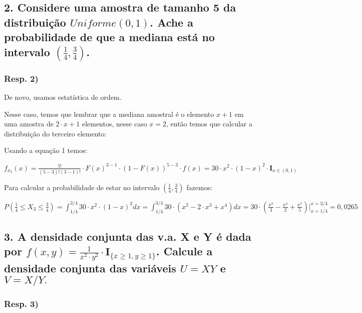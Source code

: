 \documentclass[english]{article}
\begin{document}
\subsection*{\textcompwordmark{}}


\subsection*{\textmd{2. Considere uma amostra de tamanho 5 da distribuição $Uniforme(0,1)$.
Ache a probabilidade de que a mediana está no intervalo $(\frac{1}{4},\frac{3}{4})$. }}


\subsubsection*{\textmd{Resp}. \textmd{2)}}

De novo, usamos estatística de ordem.

Nesse caso, temos que lembrar que a mediana amostral é o elemento
$x+1$ em uma amostra de $2\cdot x+1$ elementos, nesse caso $x=2$,
então temos que calcular a distribuição do terceiro elemento:

Usando a equação 1 temos:

$f_{x_{3}}(x)=\frac{5!}{(5-3)!(3-1)!}\cdot F(x)^{3-1}\cdot(1-F(x))^{5-3}\cdot f(x)=30\cdot x^{2}\cdot(1-x)^{2}\cdot\mathbf{I}_{x\in(0,1)}$

Para calcular a probabilidade de estar no intervalo $(\frac{1}{4},\frac{3}{4})$
fazemos:

$P(\frac{1}{4}\leq X_{3}\leq\frac{3}{4})=\int_{1/4}^{3/4}30\cdot x^{2}\cdot(1-x)^{2}dx=\int_{1/4}^{3/4}30\cdot(x^{2}-2\cdot x^{3}+x^{4})dx=30\cdot(\frac{x^{3}}{3}-\frac{x^{4}}{2}+\frac{x^{5}}{5})|_{x=1/4}^{x=3/4}=0,0265$


\subsection*{\textcompwordmark{}}


\subsection*{\textmd{3. A densidade conjunta das v.a. X e Y é dada por $f(x,y)=\frac{1}{x^{2}\cdot y^{2}}\cdot\mathbf{I}_{\{x\ge1,y\ge1\}}$.
Calcule a densidade conjunta das variáveis $U=XY$ e $V=X/Y.$}}


\subsubsection*{\textmd{Resp}. \textmd{3)}}
\end{document}

